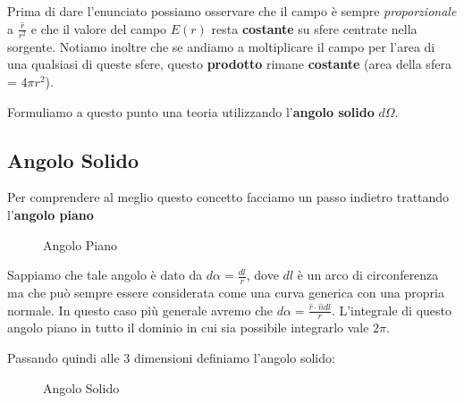Prima di dare l'enunciato possiamo osservare che il campo è sempre \textit{proporzionale} a $\frac{\hat{r}}{r^2}$ e che il valore del campo $E(r)$ resta \textbf{costante} su sfere centrate nella sorgente. Notiamo inoltre che se andiamo a moltiplicare il campo per l'area di una qualsiasi di queste sfere, questo \textbf{prodotto} rimane \textbf{costante} (area della sfera = $4\pi r^2$).

Formuliamo a questo punto una teoria utilizzando l'\textbf{angolo solido} $d \Omega$.

\subsection{Angolo Solido}
Per comprendere al meglio questo concetto facciamo un passo indietro trattando l'\textbf{angolo piano}

\begin{figure}[ht]
	\centering
\caption{Angolo Piano}
\end{figure}

Sappiamo che tale angolo è dato da $d\alpha = \frac{dl}{r}$, dove $dl$ è un arco di circonferenza ma che può sempre essere considerata come una curva generica con una propria normale. In questo caso più generale avremo che $d\alpha = \frac{\hat{r} \cdot \hat{n} dl}{r}$. L'integrale di questo angolo piano in tutto il dominio in cui sia possibile integrarlo vale $2\pi$.

Passando quindi alle 3 dimensioni definiamo l'angolo solido: 
\begin{figure}[ht]
	\centering
	\caption{Angolo Solido}
\end{figure}

